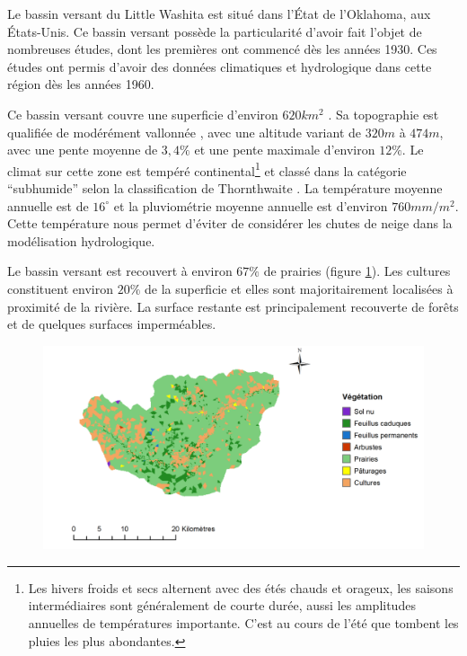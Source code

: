 \documentclass[a4paper,11pt]{article}
\numberwithin{equation}{section}
\begin{document}
Le bassin versant du Little Washita est situé dans l’État de l’Oklahoma, aux États-Unis. Ce bassin versant possède la particularité d’avoir fait l’objet de nombreuses études, dont les premières ont commencé dès les années 1930. Ces études ont permis d'avoir des données climatiques et hydrologique dans cette région dès les années 1960.

Ce bassin versant couvre une superficie d’environ $620 km^2$ . Sa topographie est qualifiée de modérément vallonnée \cite{allen1991hydrology}, avec une altitude variant de $320 m$ à $474 m$, avec une pente moyenne de $3,4 \%$ et une pente maximale d’environ $12 \%$. Le climat sur cette zone est tempéré continental\footnote{Les hivers froids et secs alternent avec des étés chauds et orageux, les saisons intermédiaires sont généralement de courte durée, aussi les amplitudes annuelles de températures importante. C'est au cours de l'été que tombent les pluies les plus abondantes.} \cite{rosero2011ensemble} et classé dans la catégorie ``subhumide'' selon la classification de Thornthwaite \cite{allen1991hydrology}. La température moyenne annuelle est de $16^{\circ}$ et la pluviométrie moyenne annuelle est d’environ $760 mm/m^2$. Cette température nous permet d'éviter de considérer les chutes de neige dans la modélisation hydrologique.

Le bassin versant est recouvert à environ $67\%$ de prairies (figure \ref{fig-little-washita-vegetation}). Les cultures constituent environ $20\%$ de la superficie et elles sont majoritairement localisées à proximité de la rivière. La surface restante est principalement recouverte de forêts et de quelques surfaces imperméables. 

\begin{figure}[H]
	\begin{center}
		\includegraphics[scale=0.3]{vegetation_little_Washita.png}
	\end{center}
	\label{fig-little-washita-vegetation}
\end{figure}
\end{document}
